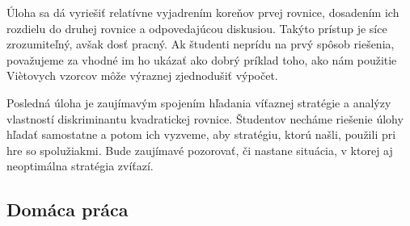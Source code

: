 






\kom Úloha sa dá vyriešiť relatívne  vyjadrením koreňov prvej rovnice, dosadením ich rozdielu do druhej rovnice a odpovedajúcou diskusiou. Takýto prístup je síce zrozumiteľný, avšak dosť pracný. Ak študenti neprídu na prvý spôsob riešenia, považujeme za vhodné im ho ukázať ako dobrý príklad toho, ako nám použitie Viètovych vzorcov môže výraznej zjednodušiť výpočet.



\kom Posledná úloha je zaujímavým spojením hľadania víťaznej stratégie a analýzy vlastností diskriminantu kvadratickej rovnice. Študentov necháme riešenie úlohy hľadať samostatne a potom ich vyzveme, aby stratégiu, ktorú našli, použili pri hre so spolužiakmi. Bude zaujímavé pozorovať, či nastane situácia, v ktorej aj neoptimálna stratégia zvíťazí.


\subsection*{Domáca práca}









